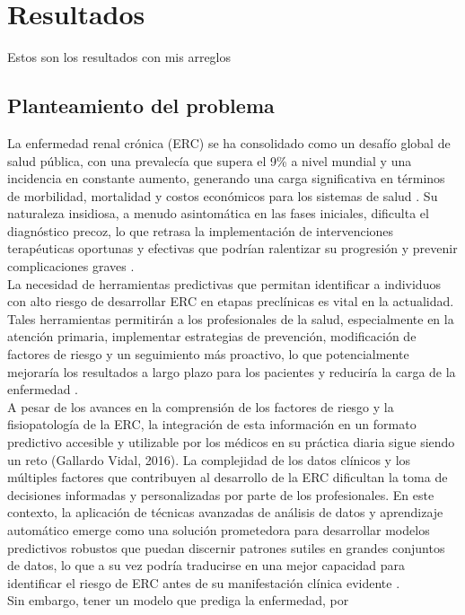 \documentclass{article}
\begin{document}
\section{Resultados}
Estos son los resultados con mis arreglos
\subsection{Planteamiento del problema}
La enfermedad renal crónica (ERC) se ha consolidado como un
desafío global de salud pública, con una prevalecía que
supera el 9\% a nivel mundial y una incidencia en constante
aumento, generando una carga significativa en términos de
morbilidad, mortalidad y costos económicos para los sistemas
de salud \cite{PillajoSanchez2021} . Su naturaleza insidiosa, a
menudo asintomática en las fases iniciales, dificulta el
diagnóstico precoz, lo que retrasa la implementación de
intervenciones terapéuticas oportunas y efectivas que
podrían ralentizar su progresión y prevenir complicaciones
graves \cite{SysmexEspana}.\\
La necesidad de herramientas predictivas
que permitan identificar a individuos con alto riesgo de
desarrollar ERC en etapas preclínicas es vital en la
actualidad. Tales
herramientas permitirán a los profesionales de la salud, especialmente en
la atención primaria, implementar estrategias de prevención,
modificación de factores de riesgo y un seguimiento más
proactivo, lo que potencialmente mejoraría los resultados a
largo plazo para los pacientes y reduciría la carga de la
enfermedad \cite{MinisterioSaludChile2010}.\\
A pesar de los avances en la comprensión de los factores de
riesgo y la fisiopatología de la ERC, la integración de esta
información en un formato predictivo accesible y utilizable
por los médicos en su práctica diaria sigue siendo un reto
(Gallardo Vidal, 2016). La complejidad de los datos clínicos
y los múltiples factores que contribuyen al desarrollo de la
ERC dificultan la toma de decisiones informadas y
personalizadas por parte de los profesionales. En este
contexto, la aplicación de técnicas avanzadas de análisis de
datos y aprendizaje automático emerge como una solución
prometedora para desarrollar modelos predictivos robustos
que puedan discernir patrones sutiles en grandes conjuntos
de datos, lo que a su vez podría traducirse en una mejor
capacidad para identificar el riesgo de ERC antes de su
manifestación clínica evidente \cite{EscalonaGonzales1}.\\
Sin embargo, tener un modelo que prediga la enfermedad, por
\end{document}

